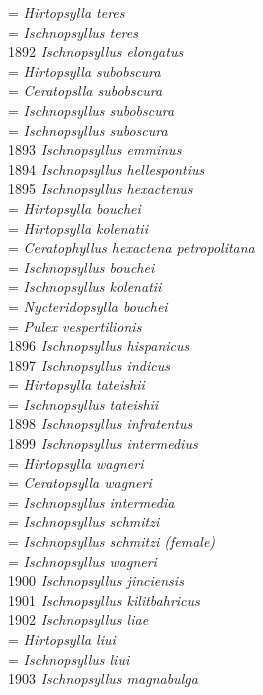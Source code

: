 \documentclass[
]{article}
\begin{document}
= \emph{Hirtopsylla teres}\\
= \emph{Ischnopsyllus teres}\\
1892 \emph{Ischnopsyllus elongatus}\\
= \emph{Hirtopsylla subobscura}\\
= \emph{Ceratopslla subobscura}\\
= \emph{Ischnopsyllus subobscura}\\
= \emph{Ischnopsyllus suboscura}\\
1893 \emph{Ischnopsyllus emminus}\\
1894 \emph{Ischnopsyllus hellespontius}\\
1895 \emph{Ischnopsyllus hexactenus}\\
= \emph{Hirtopsylla bouchei}\\
= \emph{Hirtopsylla kolenatii}\\
= \emph{Ceratophyllus hexactena petropolitana}\\
= \emph{Ischnopsyllus bouchei}\\
= \emph{Ischnopsyllus kolenatii}\\
= \emph{Nycteridopsylla bouchei}\\
= \emph{Pulex vespertilionis}\\
1896 \emph{Ischnopsyllus hispanicus}\\
1897 \emph{Ischnopsyllus indicus}\\
= \emph{Hirtopsylla tateishii}\\
= \emph{Ischnopsyllus tateishii}\\
1898 \emph{Ischnopsyllus infratentus}\\
1899 \emph{Ischnopsyllus intermedius}\\
= \emph{Hirtopsylla wagneri}\\
= \emph{Ceratopsylla wagneri}\\
= \emph{Ischnopsyllus intermedia}\\
= \emph{Ischnopsyllus schmitzi}\\
= \emph{Ischnopsyllus schmitzi (female)}\\
= \emph{Ischnopsyllus wagneri}\\
1900 \emph{Ischnopsyllus jinciensis}\\
1901 \emph{Ischnopsyllus kilitbahricus}\\
1902 \emph{Ischnopsyllus liae}\\
= \emph{Hirtopsylla liui}\\
= \emph{Ischnopsyllus liui}\\
1903 \emph{Ischnopsyllus magnabulga}\\
\end{document}
